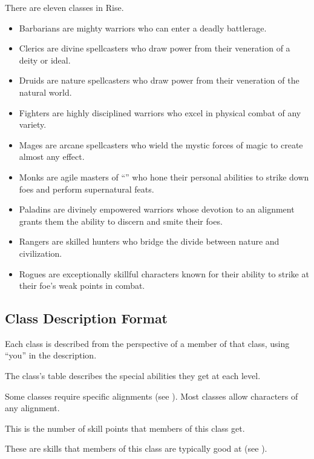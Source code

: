     There are eleven classes in Rise.
    \begin{itemize}
        \item Barbarians are mighty warriors who can enter a deadly battlerage.
        \item Clerics are divine spellcasters who draw power from their veneration of a deity or ideal.
        \item Druids are nature spellcasters who draw power from their veneration of the natural world.
        \item Fighters are highly disciplined warriors who excel in physical combat of any variety.
        \item Mages are arcane spellcasters who wield the mystic forces of magic to create almost any effect.
        \item Monks are agile masters of ``\ki'' who hone their personal abilities to strike down foes and perform supernatural feats.
        \item Paladins are divinely empowered warriors whose devotion to an alignment grants them the ability to discern and smite their foes.
        \item Rangers are skilled hunters who bridge the divide between nature and civilization.
        \item Rogues are exceptionally skillful characters known for their ability to strike at their foe's weak points in combat.
    \end{itemize}

    \subsection{Class Description Format}
        Each class is described from the perspective of a member of that class, using ``you'' in the description.

        The class's table describes the special abilities they get at each level.

        Some classes require specific alignments (see ).
        Most classes allow characters of any alignment.

        This is the number of skill points that members of this class get.

        These are skills that members of this class are typically good at (see ).

